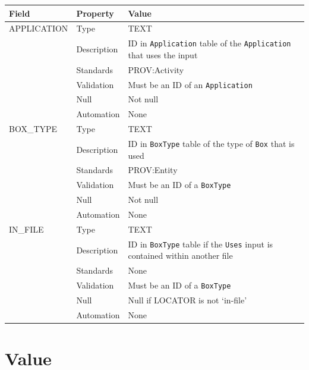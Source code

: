 \documentclass[
]{article}
\newcounter{none} %
\begin{document}
{\def\LTcaptype{none} %
\begin{longtable}[]{@{}
  >{\raggedright\arraybackslash}p{}
  >{\raggedright\arraybackslash}p{}
  >{\raggedright\arraybackslash}p{}@{}}
\toprule\noalign{}
\begin{minipage}[b]{\linewidth}\raggedright
Field
\end{minipage} & \begin{minipage}[b]{\linewidth}\raggedright
Property
\end{minipage} & \begin{minipage}[b]{\linewidth}\raggedright
Value
\end{minipage} \\
\midrule\noalign{}
\endhead
\bottomrule\noalign{}
\endlastfoot
APPLICATION & Type & TEXT \\
& Description & ID in \texttt{Application} table of the
\texttt{Application} that uses the input \\
& Standards & PROV:Activity \\
& Validation & Must be an ID of an \texttt{Application} \\
& Null & Not null \\
& Automation & None \\
BOX\_TYPE & Type & TEXT \\
& Description & ID in \texttt{BoxType} table of the type of \texttt{Box}
that is used \\
& Standards & PROV:Entity \\
& Validation & Must be an ID of a \texttt{BoxType} \\
& Null & Not null \\
& Automation & None \\
IN\_FILE & Type & TEXT \\
& Description & ID in \texttt{BoxType} table if the \texttt{Uses} input
is contained within another file \\
& Standards & None \\
& Validation & Must be an ID of a \texttt{BoxType} \\
& Null & Null if LOCATOR is not `in-file' \\
& Automation & None \\
\end{longtable}
}

\section{Value}\label{value}
\end{document}
